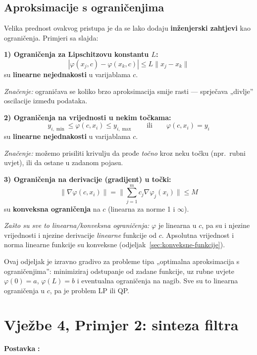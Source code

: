 \subsection{Aproksimacije s ograničenjima}

Velika prednost ovakvog pristupa je da se lako dodaju \textbf{inženjerski
zahtjevi} kao ograničenja. Primjeri sa slajda:

\textbf{1) Ograničenja za Lipschitzovu konstantu $L$:}
\[
|\varphi(x_j,c) - \varphi(x_k,c)| \le L\|x_j - x_k\|
\]
su \textbf{linearne nejednakosti} u varijablama $c$.

\emph{Značenje:} ograničava se koliko brzo aproksimacija smije rasti --- sprječava
„divlje” oscilacije između podataka.

\textbf{2) Ograničenja na vrijednosti u nekim točkama:}
\[
y_{i,\min} \le \varphi(c, x_i) \le y_{i,\max}
\qquad\text{ili}\qquad
\varphi(c, x_i) = y_i
\]
su \textbf{linearne nejednakosti} u varijablama $c$.

\emph{Značenje:} možemo prisiliti krivulju da prođe \emph{točno} kroz neku
točku (npr.\ rubni uvjet), ili da ostane u zadanom pojasu.

\textbf{3) Ograničenja na derivacije (gradijent) u točki:}
\[
\|\nabla\varphi(c,x_i)\| = \Big\|\sum_{j=1}^{m}c_j\nabla\varphi_j(x_i)\Big\|
\le M
\]
su \textbf{konveksna ograničenja} na $c$ (linearna za norme 1 i $\infty$).

\emph{Zašto su sve to linearna/konveksna ograničenja:} $\varphi$ je linearna u
$c$, pa su i njezine vrijednosti i njezine derivacije \emph{linearne} funkcije
od $c$. Apsolutna vrijednost i norma linearne funkcije su konveksne
(odjeljak~\ref{sec:konveksne-funkcije}).

\begin{napomena}
Ovaj odjeljak je izravno gradivo za probleme tipa „optimalna aproksimacija s
ograničenjima”: minimiziraj odstupanje od zadane funkcije, uz rubne uvjete
$\varphi(0) = a$, $\varphi(L) = b$ i eventualna ograničenja na nagib. Sve su to
linearna ograničenja u $c$, pa je problem LP ili QP.
\end{napomena}

\section{Vježbe 4, Primjer 2: sinteza filtra}

\textbf{Postavka} \textbf{:}

